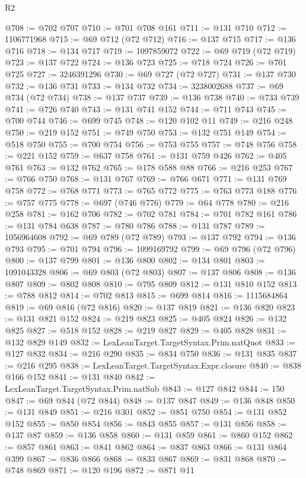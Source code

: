\begin{lexlean}{R2}
\begin{coremodule}
@708 := @702 @707
@710 := @701 @708 @161
@711 := @131 @710
@712 := 1106771968
@715 := @69 @712 (@72 @712)
@716 := @137 @715
@717 := @136 @716
@718 := @134 @717
@719 := 1097859072
@722 := @69 @719 (@72 @719)
@723 := @137 @722
@724 := @136 @723
@725 := @718 @724
@726 := @701 @725
@727 := 3246391296
@730 := @69 @727 (@72 @727)
@731 := @137 @730
@732 := @136 @731
@733 := @134 @732
@734 := 3238002688
@737 := @69 @734 (@72 @734)
@738 := @137 @737
@739 := @136 @738
@740 := @733 @739
@741 := @726 @740
@743 := @131 @741 @152
@744 := @711 @743
@745 := @700 @744
@746 := @699 @745
@748 := @120 @102 @11
@749 := @216 @248
@750 := @219 @152
@751 := @749 @750
@753 := @132 @751 @149
@754 := @518 @750
@755 := @700 @754
@756 := @753 @755
@757 := @748 @756
@758 := @221 @152
@759 := @637 @758
@761 := @131 @759 @426
@762 := @405 @761
@763 := @132 @762
@765 := @178 @588 @88
@766 := @216 @253
@767 := @766 @750
@768 := @131 @767
@769 := @766 @671
@771 := @131 @769 @758
@772 := @768 @771
@773 := @765 @772
@775 := @763 @773 @188
@776 := @757 @775
@778 := @697 (@746 @776)
@779 := @64 @778
@780 := @216 @258
@781 := @162 @706
@782 := @702 @781
@784 := @701 @782 @161
@786 := @131 @784 @638
@787 := @780 @786
@788 := @131 @787
@789 := 1056964608
@792 := @69 @789 (@72 @789)
@793 := @137 @792
@794 := @136 @793
@795 := @701 @794
@796 := 1099169792
@799 := @69 @796 (@72 @796)
@800 := @137 @799
@801 := @136 @800
@802 := @134 @801
@803 := 1091043328
@806 := @69 @803 (@72 @803)
@807 := @137 @806
@808 := @136 @807
@809 := @802 @808
@810 := @795 @809
@812 := @131 @810 @152
@813 := @788 @812
@814 := @702 @813
@815 := @699 @814
@816 := 1115684864
@819 := @69 @816 (@72 @816)
@820 := @137 @819
@821 := @136 @820
@823 := @131 @821 @152
@824 := @219 @823
@825 := @405 @824
@826 := @132 @825
@827 := @518 @152
@828 := @219 @827
@829 := @405 @828
@831 := @132 @829 @149
@832 := LexLeanTarget.TargetSyntax.Prim.natQuot
@833 := @127 @832
@834 := @216 @290
@835 := @834 @750
@836 := @131 @835
@837 := @216 @295
@838 := LexLeanTarget.TargetSyntax.Expr.closure
@840 := @838 @166 @152
@841 := @131 @840
@842 := LexLeanTarget.TargetSyntax.Prim.natSub
@843 := @127 @842
@844 := 150
@847 := @69 @844 (@72 @844)
@848 := @137 @847
@849 := @136 @848
@850 := @131 @849
@851 := @216 @301
@852 := @851 @750
@854 := @131 @852 @152
@855 := @850 @854
@856 := @843 @855
@857 := @131 @856
@858 := @137 @87
@859 := @136 @858
@860 := @131 @859
@861 := @860 @152
@862 := @857 @861
@863 := @841 @862
@864 := @837 @863
@866 := @131 @864 @399
@867 := @836 @866
@868 := @833 @867
@869 := @831 @868
@870 := @748 @869
@871 := @120 @196
@872 := @871 @11

\end{coremodule}
\end{lexlean}
